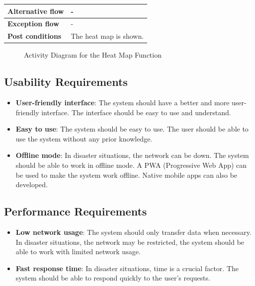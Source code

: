 \documentclass[a4paper]{article}
\begin{document}
\begin{table}[H]
{\begin{tabular}{|l|l|}
            \textbf{Alternative flow} & - \\\hline
            \textbf{Exception flow}   & -                                                                                                                                                                                                              \\ \hline
            \textbf{Post conditions}  & The heat map is shown. \\ \hline
            \end{tabular}%
            }
        \end{table}
        \begin{figure}[H]
            \centering
            
            \caption{Activity Diagram for the Heat Map Function}
        \end{figure}
        \vspace{1cm}

        \subsection{Usability Requirements}
    
        \begin{itemize}
            \item \textbf{User-friendly interface}: The system should have a better and more user-friendly interface. The interface should be easy to use and understand.
            \item \textbf{Easy to use}: The system should be easy to use. The user should be able to use the system without any prior knowledge.
            \item \textbf{Offline mode}: In disaster situations, the network can be down. The system should be able to work in offline mode. A PWA (Progressive Web App) can be used to make the system work offline. Native mobile apps can also be developed.
        \end{itemize}
        
        \subsection{Performance Requirements}
        
        \begin{itemize}
            \item \textbf{Low network usage}: The system should only transfer data when necessary. In disaster situations, the network may be restricted, the system should be able to work with limited network usage.
            \item \textbf{Fast response time}: In disaster situations, time is a crucial factor. The system should be able to respond quickly to the user's requests.
        \end{itemize}
        
\end{document}
